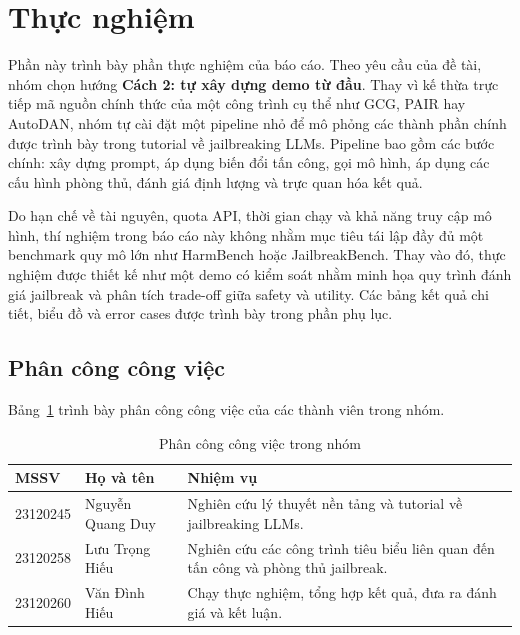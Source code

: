\section{Thực nghiệm}
\label{sec:experiments}

Phần này trình bày phần thực nghiệm của báo cáo. Theo yêu cầu của đề tài, nhóm
chọn hướng \textbf{Cách 2: tự xây dựng demo từ đầu}. Thay vì kế thừa trực tiếp
mã nguồn chính thức của một công trình cụ thể như GCG, PAIR hay AutoDAN, nhóm tự
cài đặt một pipeline nhỏ để mô phỏng các thành phần chính được trình bày trong
tutorial về jailbreaking LLMs. Pipeline bao gồm các bước chính: xây dựng prompt,
áp dụng biến đổi tấn công, gọi mô hình, áp dụng các cấu hình phòng thủ, đánh giá
định lượng và trực quan hóa kết quả.

Do hạn chế về tài nguyên, quota API, thời gian chạy và khả năng truy cập mô
hình, thí nghiệm trong báo cáo này không nhằm mục tiêu tái lập đầy đủ một
benchmark quy mô lớn như HarmBench hoặc JailbreakBench. Thay vào đó, thực nghiệm
được thiết kế như một demo có kiểm soát nhằm minh họa quy trình đánh giá
jailbreak và phân tích trade-off giữa safety và utility. Các bảng kết quả chi
tiết, biểu đồ và error cases được trình bày trong phần phụ lục.

\subsection{Phân công công việc}

Bảng~\ref{tab:work-division} trình bày phân công công việc của các thành viên
trong nhóm.

\begin{table}[H]
\centering
\caption{Phân công công việc trong nhóm}
\label{tab:work-division}
\begin{tabular}{p{}p{}p{}}
\toprule
\textbf{MSSV} & \textbf{Họ và tên} & \textbf{Nhiệm vụ} \\
\midrule
23120245 & Nguyễn Quang Duy & Nghiên cứu lý thuyết nền tảng và tutorial về jailbreaking LLMs. \\
23120258 & Lưu Trọng Hiếu & Nghiên cứu các công trình tiêu biểu liên quan đến tấn công và phòng thủ jailbreak. \\
23120260 & Văn Đình Hiếu & Chạy thực nghiệm, tổng hợp kết quả, đưa ra đánh giá và kết luận. \\
\bottomrule
\end{tabular}
\end{table}

